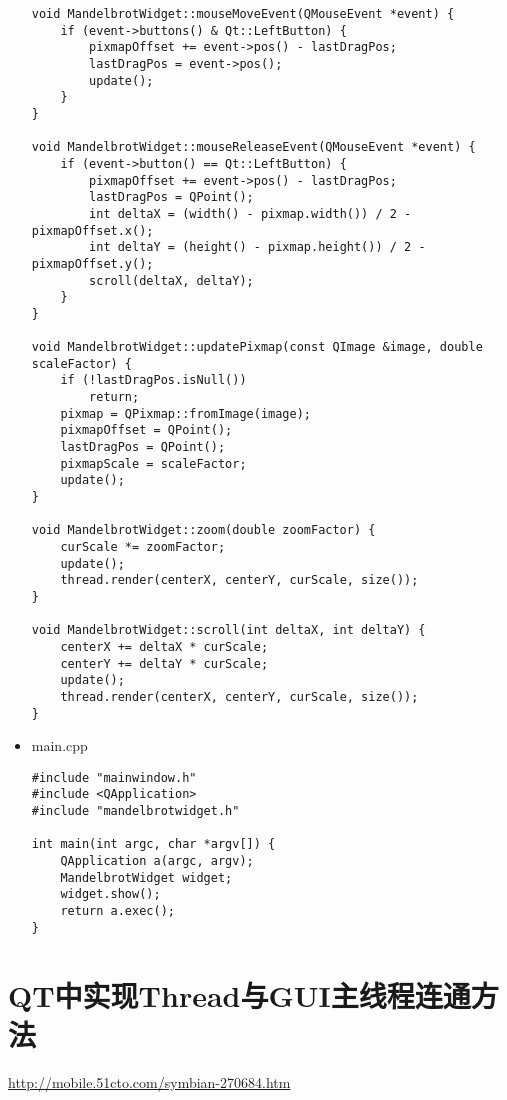 \documentclass[9pt,b5paper]{article}
\begin{document}
\begin{itemize}
\begin{lstlisting}
void MandelbrotWidget::mouseMoveEvent(QMouseEvent *event) {
    if (event->buttons() & Qt::LeftButton) {
        pixmapOffset += event->pos() - lastDragPos;
        lastDragPos = event->pos();
        update();
    }
}

void MandelbrotWidget::mouseReleaseEvent(QMouseEvent *event) {
    if (event->button() == Qt::LeftButton) {
        pixmapOffset += event->pos() - lastDragPos;
        lastDragPos = QPoint();
        int deltaX = (width() - pixmap.width()) / 2 - pixmapOffset.x();
        int deltaY = (height() - pixmap.height()) / 2 - pixmapOffset.y();
        scroll(deltaX, deltaY);
    }
}

void MandelbrotWidget::updatePixmap(const QImage &image, double scaleFactor) {
    if (!lastDragPos.isNull()) 
        return;
    pixmap = QPixmap::fromImage(image);
    pixmapOffset = QPoint();
    lastDragPos = QPoint();
    pixmapScale = scaleFactor;
    update();
}

void MandelbrotWidget::zoom(double zoomFactor) {
    curScale *= zoomFactor;
    update();
    thread.render(centerX, centerY, curScale, size());
}

void MandelbrotWidget::scroll(int deltaX, int deltaY) {
    centerX += deltaX * curScale;
    centerY += deltaY * curScale;
    update();
    thread.render(centerX, centerY, curScale, size());
}
\end{lstlisting}
\item main.cpp
\lstset{language=java,label= ,caption= ,numbers=none}
\begin{lstlisting}
#include "mainwindow.h"
#include <QApplication>
#include "mandelbrotwidget.h"

int main(int argc, char *argv[]) {
    QApplication a(argc, argv);
    MandelbrotWidget widget;
    widget.show();
    return a.exec();
}
\end{lstlisting}
\end{itemize}

\section{QT中实现Thread与GUI主线程连通方法}
\label{sec-7}
\url{http://mobile.51cto.com/symbian-270684.htm}
\subsection{}
\label{sec-7-1}
\end{document}
